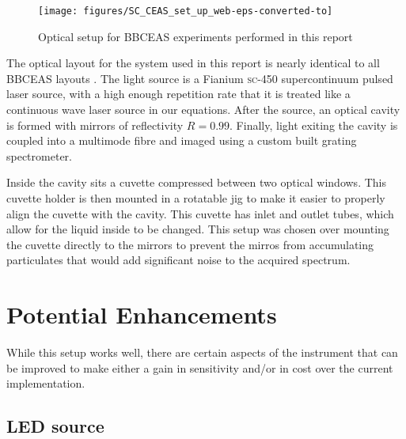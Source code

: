 \begin{figure}
\begin{center}
\texttt{[image: figures/SC\_CEAS\_set\_up\_web-eps-converted-to]}
\end{center}
\caption{Optical setup for \ac{BBCEAS} experiments performed in this report}
\label{fig:optical_layout}
\end{figure}

The optical layout for the system used in this report is nearly identical to
all \ac{BBCEAS} layouts \cite{Berden:2009wk}. The light source is a Fianium
\textsc{sc-450} supercontinuum pulsed laser source, with a high enough
repetition rate that it is treated like a continuous wave laser source in our
equations. After the source, an optical cavity is formed with mirrors of
reflectivity $R=0.99$. Finally, light exiting the cavity is coupled into a
multimode fibre and imaged using a custom built grating spectrometer.

Inside the cavity sits a cuvette compressed between two optical windows. This
cuvette holder is then mounted in a rotatable jig to make it easier to properly
align the cuvette with the cavity. This cuvette has inlet and outlet tubes,
which allow for the liquid inside to be changed. This setup was chosen over
mounting the cuvette directly to the mirrors \cite{Seetohul:2009ij} to prevent
the mirros from accumulating particulates that would add significant noise to
the acquired spectrum.




\section{Potential Enhancements}\label{sec:bbceas_enhance}

While this setup works well, there are certain aspects of the instrument that
can be improved to make either a gain in sensitivity and/or in cost over the
current implementation.

\subsection{LED source}\label{sec:bbceas_led}

